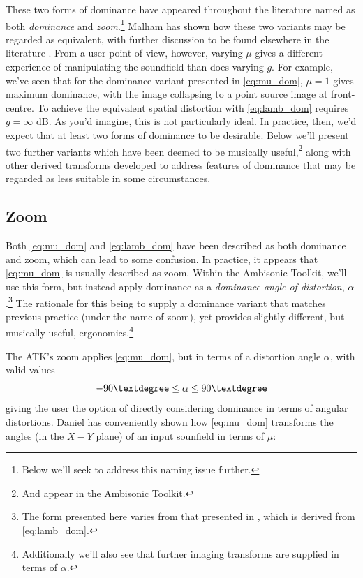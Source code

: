 \documentclass[12pt]{article}
\begin{document}
These two forms of dominance have appeared throughout the literature named as both {\em dominance} and {\em zoom}.\footnote{Below we'll seek to address this naming issue further.} Malham \cite{malham:90} has shown how these two variants may be regarded as equivalent, with further discussion to be found elsewhere in the literature \cite{daniel:01} \cite{hollerweger:06}. From a user point of view, however, varying \(\mu\) gives a different experience of manipulating the soundfield than does varying \(g\). For example, we've seen that for the dominance variant presented in \eqref{eq:mu_dom}, \(\mu = 1\) gives maximum dominance, with the image collapsing to a point source image at front-centre. To achieve the equivalent spatial distortion with \eqref{eq:lamb_dom} requires \(g= \infty\) dB. As you'd imagine, this is not particularly ideal. In practice, then, we'd expect that at least two forms of dominance to be desirable. Below we'll present two further variants which have been deemed to be musically useful,\footnote{And appear in the Ambisonic Toolkit.} along with other derived transforms developed to address features of dominance that may be regarded as less suitable in some circumstances.



\subsection{Zoom}

Both \eqref{eq:mu_dom} and \eqref{eq:lamb_dom} have been described as both dominance and zoom, which can lead to some confusion. In practice, it appears that \eqref{eq:mu_dom} is usually described as zoom. Within the Ambisonic Toolkit, we'll use this form, but instead apply dominance as a {\em dominance angle of distortion}, \(\alpha\).\footnote{The form presented here varies from that presented in \cite{anderson:09a}, which is derived from \eqref{eq:lamb_dom}.} The rationale for this being to supply a dominance variant that matches previous practice (under the name of zoom), yet provides slightly different, but musically useful, ergonomics.\footnote{Additionally we'll also see that further imaging transforms are supplied in terms of \(\alpha\).}

The ATK's zoom applies \eqref{eq:mu_dom}, but in terms of a distortion angle \(\alpha\), with valid values \begin{equation}
	-90\textdegree \leq \alpha \leq 90\textdegree
\end{equation} giving the user the option of directly considering dominance in terms of angular distortions. Daniel \cite{daniel:01} has conveniently shown how \eqref{eq:mu_dom} transforms the angles (in the \(X-Y\) plane) of an input sounfield in terms of \(\mu\):
\end{document}
